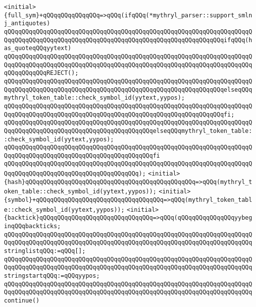 \verb|<initial>{full_sym}+qQQqqQQqqQQqqQQq=>qQQq(ifqQQq(*mythryl_parser::support_smlnj_antiquotes)|\newline
\verb|qQQqqQQqqQQqqQQqqQQqqQQqqQQqqQQqqQQqqQQqqQQqqQQqqQQqqQQqqQQqqQQqqQQqqQQqqQQqqQQqqQQqqQQqqQQqqQQqqQQqqQQqqQQqqQQqqQQqqQQqqQQqqQQqqQQqifqQQq(has_quoteqQQqyytext)|\newline
\verb|qQQqqQQqqQQqqQQqqQQqqQQqqQQqqQQqqQQqqQQqqQQqqQQqqQQqqQQqqQQqqQQqqQQqqQQqqQQqqQQqqQQqqQQqqQQqqQQqqQQqqQQqqQQqqQQqqQQqqQQqqQQqqQQqqQQqqQQqqQQqqQQqqQQqqQQqREJECT();|\newline
\verb|qQQqqQQqqQQqqQQqqQQqqQQqqQQqqQQqqQQqqQQqqQQqqQQqqQQqqQQqqQQqqQQqqQQqqQQqqQQqqQQqqQQqqQQqqQQqqQQqqQQqqQQqqQQqqQQqqQQqqQQqqQQqqQQqqQQqelseqQQqmythryl_token_table::check_symbol_id(yytext,yypos);|\newline
\verb|qQQqqQQqqQQqqQQqqQQqqQQqqQQqqQQqqQQqqQQqqQQqqQQqqQQqqQQqqQQqqQQqqQQqqQQqqQQqqQQqqQQqqQQqqQQqqQQqqQQqqQQqqQQqqQQqqQQqqQQqqQQqqQQqqQQqfi;|\newline
\verb|qQQqqQQqqQQqqQQqqQQqqQQqqQQqqQQqqQQqqQQqqQQqqQQqqQQqqQQqqQQqqQQqqQQqqQQqqQQqqQQqqQQqqQQqqQQqqQQqqQQqqQQqqQQqqQQqelseqQQqmythryl_token_table::check_symbol_id(yytext,yypos);|\newline
\verb|qQQqqQQqqQQqqQQqqQQqqQQqqQQqqQQqqQQqqQQqqQQqqQQqqQQqqQQqqQQqqQQqqQQqqQQqqQQqqQQqqQQqqQQqqQQqqQQqqQQqqQQqqQQqqQQqfi|\newline
\verb|qQQqqQQqqQQqqQQqqQQqqQQqqQQqqQQqqQQqqQQqqQQqqQQqqQQqqQQqqQQqqQQqqQQqqQQqqQQqqQQqqQQqqQQqqQQqqQQqqQQqqQQqqQQq);|\newline
\verb|<initial>{hash}qQQqqQQqqQQqqQQqqQQqqQQqqQQqqQQqqQQqqQQqqQQqqQQq=>qQQq(mythryl_token_table::check_symbol_id(yytext,yypos));|\newline
\verb|<initial>{symbol}+qQQqqQQqqQQqqQQqqQQqqQQqqQQqqQQqqQQq=>qQQq(mythryl_token_table::check_symbol_id(yytext,yypos));|\newline
\verb|<initial>{backtick}qQQqqQQqqQQqqQQqqQQqqQQqqQQqqQQq=>qQQq(qQQqqQQqqQQqqQQqyybeginqQQqbackticks;|\newline
\verb|qQQqqQQqqQQqqQQqqQQqqQQqqQQqqQQqqQQqqQQqqQQqqQQqqQQqqQQqqQQqqQQqqQQqqQQqqQQqqQQqqQQqqQQqqQQqqQQqqQQqqQQqqQQqqQQqqQQqqQQqqQQqqQQqqQQqqQQqqQQqstringlistqQQq:=qQQq[];|\newline
\verb|qQQqqQQqqQQqqQQqqQQqqQQqqQQqqQQqqQQqqQQqqQQqqQQqqQQqqQQqqQQqqQQqqQQqqQQqqQQqqQQqqQQqqQQqqQQqqQQqqQQqqQQqqQQqqQQqqQQqqQQqqQQqqQQqqQQqqQQqqQQqstringstartqQQq:=qQQqyypos;|\newline
\verb|qQQqqQQqqQQqqQQqqQQqqQQqqQQqqQQqqQQqqQQqqQQqqQQqqQQqqQQqqQQqqQQqqQQqqQQqqQQqqQQqqQQqqQQqqQQqqQQqqQQqqQQqqQQqqQQqqQQqqQQqqQQqqQQqqQQqqQQqqQQqcontinue()|\newline
